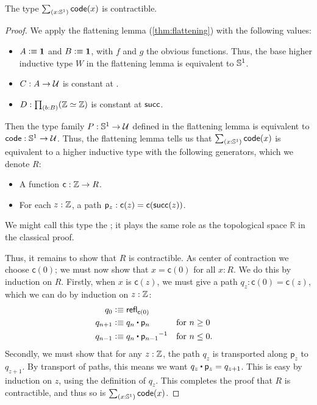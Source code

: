 \begin{lem}
  The type $\sm{x:\Sn^1}\code(x)$ is contractible.
\end{lem}
\begin{proof}
  We apply the flattening lemma (\autoref{thm:flattening}) with the following values:
  \begin{itemize}
  \item $A\vcentcolon\equiv\mathbf{1}$ and $B\vcentcolon\equiv\mathbf{1}$, with $f$ and $g$ the obvious functions.
    Thus, the base higher inductive type $W$ in the flattening lemma is equivalent to $\mathbb{S}^1$.
  \item $C:A\to\mathcal{U}$ is constant at \Z.
  \item $D:\prd{b:B} (\eqv{\Z}{\Z})$ is constant at $\mathsf{succ}$.
  \end{itemize}
  Then the type family $P:\mathbb{S}^1\to\mathcal{U}$ defined in the flattening lemma is equivalent to $\mathsf{code}:\mathbb{S}^1\to\mathcal{U}$.
  Thus, the flattening lemma tells us that $\sm{x:\Sn^1}\code(x)$ is equivalent to a higher inductive type with the following generators, which we denote $R$:
  \begin{itemize}
  \item A function $\mathsf{c}: \mathbb{Z} \to R$.
  \item For each $z:\mathbb{Z}$, a path $\mathsf{p}_z:\mathsf{c}(z) = \mathsf{c}(\mathsf{succ}(z))$.
  \end{itemize}
  We might call this type the ;
  it plays the same role as the topological space $\mathbb{R}$ in the classical proof.

  Thus, it remains to show that $R$ is contractible.
  As center of contraction we choose $\mathsf{c}(0)$; we must now show that $x=\mathsf{c}(0)$ for all $x:R$.
  We do this by induction on $R$.
  Firstly, when $x$ is $\mathsf{c}(z)$, we must give a path $q_z:\mathsf{c}(0) = \mathsf{c}(z)$, which we can do by induction on $z:\mathbb{Z}$:
  \begin{align*}
    q_0 &\defeq \refl{\mathsf{c}(0)}\\
    q_{n+1} &\defeq q_n \ct \mathsf{p}_n & &\text{for $n\ge 0$}\\
    q_{n-1} &\defeq q_n \ct \opp{\mathsf{p}_{n-1}} & &\text{for $n\le 0$.}
  \end{align*}
  Secondly, we must show that for any $z:\mathbb{Z}$, the path $q_z$ is transported along $\mathsf{p}_z$ to $q_{z+1}$.
  By transport of paths, this means we want $q_z \ct \mathsf{p}_z = q_{z+1}$.
  This is easy by induction on $z$, using the definition of $q_z$.
  This completes the proof that $R$ is contractible, and thus so is $\sm{x:\Sn^1}\code(x)$.
\end{proof}

